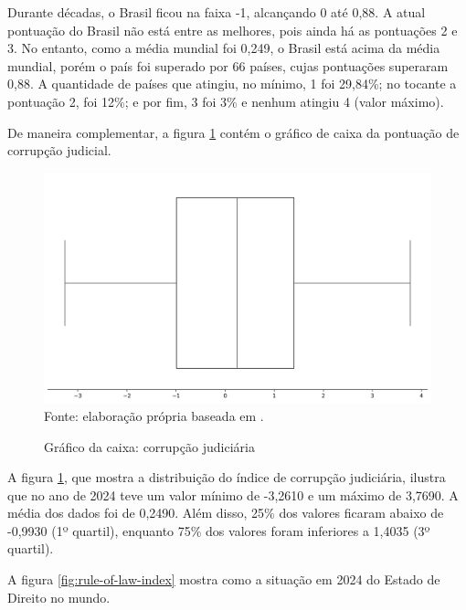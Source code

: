 Durante décadas, o Brasil ficou na faixa -1, alcançando 0 até 0,88. A atual pontuação do Brasil não está entre as melhores, pois ainda há as pontuações 2 e 3. No entanto, como a média mundial foi 0,249, o Brasil está acima da média mundial, porém o país foi superado por 66 países, cujas pontuações superaram 0,88. A quantidade de países que atingiu, no mínimo, 1 foi 29,84\%; no tocante a pontuação 2, foi 12\%; e por fim, 3 foi 3\% e nenhum atingiu 4 (valor máximo).

De maneira complementar, a figura \ref{fig:quartis_corrupcao_judiciaria} contém o gráfico de caixa da pontuação de corrupção judicial.

\begin{figure}[H]
    \centering
    \caption{Gráfico da caixa: corrupção judiciária}
    \includegraphics[width=1\linewidth]{figuras/quartis_corrupcao_judiciaria.png}
    \label{fig:quartis_corrupcao_judiciaria}
    \footnotesize{Fonte: elaboração própria baseada em \cite{judicial-corruption-score}.}
\end{figure}

A figura \ref{fig:quartis_corrupcao_judiciaria}, que mostra a distribuição do índice de corrupção judiciária, ilustra que no ano de 2024 teve um valor mínimo de -3,2610 e um máximo de 3,7690. A média dos dados foi de 0,2490. Além disso, 25\% dos valores ficaram abaixo de -0,9930 (1º quartil), enquanto 75\% dos valores foram inferiores a 1,4035 (3º quartil).

A figura \ref{fig:rule-of-law-index} mostra como a situação em 2024 do Estado de Direito no mundo.


